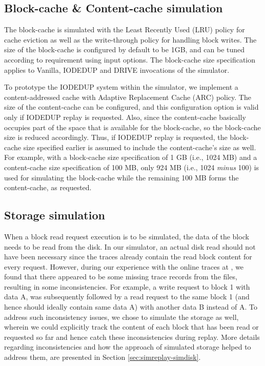 \subsection{Block-cache \& Content-cache simulation}
The block-cache is simulated with the Least Recently Used (LRU) policy
for cache eviction as well as the write-through policy for handling
block writes. The size of the block-cache is configured by default 
to be 1GB, and can be tuned according to requirement using input options.
The block-cache size specification applies to Vanilla, IODEDUP and DRIVE
invocations of the simulator. 

To prototype the IODEDUP system within the simulator, we implement a 
content-addressed cache with Adaptive Replacement Cache (ARC) policy.
The size of the content-cache can be configured, and this configuration
option is valid only if IODEDUP replay is requested. Also, since
the content-cache basically occupies part of the space that is available
for the block-cache, so the block-cache size is reduced accordingly.
Thus, if IODEDUP replay is requested, the block-cache size specified earlier
is assumed to include the content-cache's size as well.
For example, with a block-cache size specification of 1 GB (i.e., 1024 MB) and 
a content-cache size specification of 100 MB, only 
924 MB (i.e., 1024 \textit{minus} 100) is used
for simulating the block-cache while the remaining 100 MB forms the
content-cache, as requested.

\subsection{Storage simulation}
When a block read request execution is to be simulated, the data of the
block needs to be read from the disk. In our simulator, an
actual disk read should not have been necessary since the traces already 
contain the read block content for every request. However, during our
experience with the online traces at \cite{iodedup-online}, we found that
there appeared to be some missing trace records from the files, resulting
in some inconsistencies. For example, a write request 
to block 1 with data A, was subsequently followed by a read request to the
same block 1 (and hence should ideally contain same data A) with
another data B instead of A. To address such inconsistency issues,
we chose to simulate the storage as well, wherein we could explicitly track
the content of each block that has been read or requested so far and hence
catch these inconsistencies during replay. More details regarding 
inconsistencies and how the approach of simulated storage helped to address 
them, are presented in Section \ref{sec:simreplay-simdisk}.

